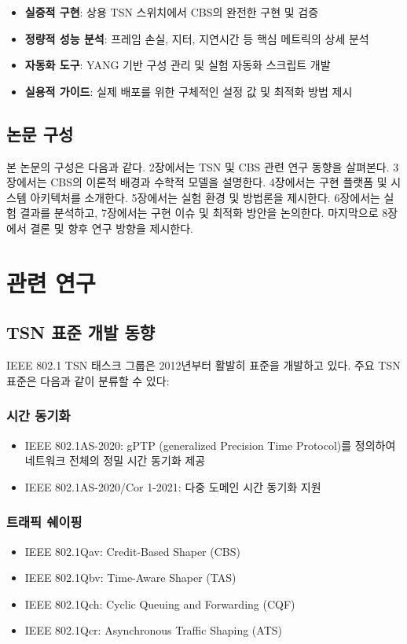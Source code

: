 \documentclass[twocolumn,10pt]{article}
\begin{document}
\begin{itemize}
    \item \textbf{실증적 구현}: 상용 TSN 스위치에서 CBS의 완전한 구현 및 검증
    \item \textbf{정량적 성능 분석}: 프레임 손실, 지터, 지연시간 등 핵심 메트릭의 상세 분석
    \item \textbf{자동화 도구}: YANG 기반 구성 관리 및 실험 자동화 스크립트 개발
    \item \textbf{실용적 가이드}: 실제 배포를 위한 구체적인 설정 값 및 최적화 방법 제시
\end{itemize}

\subsection{논문 구성}

본 논문의 구성은 다음과 같다. 2장에서는 TSN 및 CBS 관련 연구 동향을 살펴본다. 3장에서는 CBS의 이론적 배경과 수학적 모델을 설명한다. 4장에서는 구현 플랫폼 및 시스템 아키텍처를 소개한다. 5장에서는 실험 환경 및 방법론을 제시한다. 6장에서는 실험 결과를 분석하고, 7장에서는 구현 이슈 및 최적화 방안을 논의한다. 마지막으로 8장에서 결론 및 향후 연구 방향을 제시한다.

\section{관련 연구}
\label{sec:related_work}

\subsection{TSN 표준 개발 동향}

IEEE 802.1 TSN 태스크 그룹은 2012년부터 활발히 표준을 개발하고 있다. 주요 TSN 표준은 다음과 같이 분류할 수 있다:

\subsubsection{시간 동기화}
\begin{itemize}
    \item IEEE 802.1AS-2020: gPTP (generalized Precision Time Protocol)를 정의하여 네트워크 전체의 정밀 시간 동기화 제공
    \item IEEE 802.1AS-2020/Cor 1-2021: 다중 도메인 시간 동기화 지원
\end{itemize}

\subsubsection{트래픽 쉐이핑}
\begin{itemize}
    \item IEEE 802.1Qav: Credit-Based Shaper (CBS)
    \item IEEE 802.1Qbv: Time-Aware Shaper (TAS)
    \item IEEE 802.1Qch: Cyclic Queuing and Forwarding (CQF)
    \item IEEE 802.1Qcr: Asynchronous Traffic Shaping (ATS)
\end{itemize}
\end{document}
